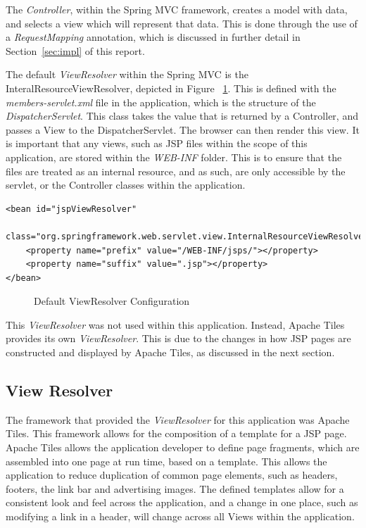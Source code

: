 The \textit{Controller}, within the Spring MVC framework, creates a model with data, and selects a view which will represent that data. This is done through the use of a \textit{RequestMapping} annotation, which is discussed in further detail in Section~\ref{sec:impl} of this report.

The default \textit{ViewResolver} within the Spring MVC is the InteralResourceViewResolver, depicted in Figure ~\ref{fig:defaultViewRes}. This is defined with the \textit{members-servlet.xml} file in the application, which is the structure of the \textit{DispatcherServlet}. This class takes the value that is returned by a Controller, and passes a View to the DispatcherServlet. The browser can then render this view. It is important that any views, such as JSP files within the scope of this application, are stored within the \textit{WEB-INF} folder. This is to ensure that the files are treated as an internal resource, and as such, are only accessible by the servlet, or the Controller classes within the application.

\begin{lstlisting}
<bean id="jspViewResolver"
	class="org.springframework.web.servlet.view.InternalResourceViewResolver">
	<property name="prefix" value="/WEB-INF/jsps/"></property>
	<property name="suffix" value=".jsp"></property>
</bean>
\end{lstlisting}
\begin{figure}[H]
\caption{Default ViewResolver Configuration}
\label{fig:defaultViewRes}
\end{figure}

This \textit{ViewResolver} was not used within this application. Instead, Apache Tiles provides its own \textit{ViewResolver}. This is due to the changes in how JSP pages are constructed and displayed by Apache Tiles, as discussed in the next section.

\subsection{View Resolver}

The framework that provided the \textit{ViewResolver} for this application was Apache Tiles. This framework allows for the composition of a template for a JSP page. Apache Tiles allows the application developer to define page fragments, which are assembled into one page at run time, based on a template. This allows the application to reduce duplication of common page elements, such as headers, footers, the link bar and advertising images.  The defined templates allow for a consistent look and feel across the application, and a change in one place, such as modifying a link in a header, will change across all Views within the application.

